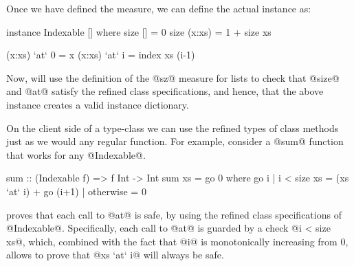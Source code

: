 Once we have defined the measure, we can define the actual
instance as:
%
\begin{code}
  instance Indexable [] where
    size []        = 0
    size (x:xs)    = 1 + size xs

    (x:xs) `at` 0  = x
    (x:xs) `at` i  = index xs (i-1)
\end{code}
%
Now, \toolname will use the definition of the @sz@ measure for lists
to check that @size@ and @at@ satisfy the refined class specifications,
and hence, that the above instance creates a valid instance dictionary.

On the client side of a type-class we can use the refined 
types of class methods just as we would any regular function. 
For example, consider a @sum@ function that works for any 
@Indexable@.
%
\begin{code}
  sum :: (Indexable f) => f Int -> Int
  sum xs = go 0
  where
    go i
      | i < size xs = (xs `at` i) + go (i+1)
      | otherwise   = 0
\end{code}
%
\toolname proves that each call to @at@ is safe, by using the refined
class specifications of @Indexable@. 
Specifically, each call to @at@ is guarded by a check @i < size xs@,
which, combined with the fact that @i@ is monotonically increasing 
from 0, allows \toolname to prove that @xs `at` i@ will always be safe.

